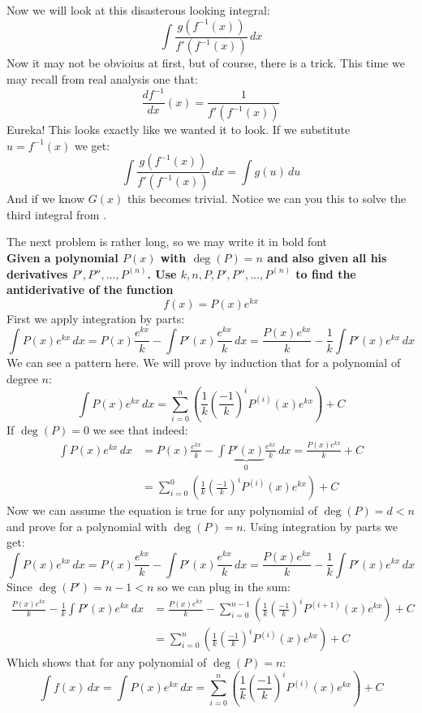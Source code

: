 \documentclass[11pt,a4paper]{article}
\begin{document}
	\newpage
	
	Now we will look at this disasterous looking integral:
	\[
		\int{\frac{g(f^{-1}(x))}{f'(f^{-1}(x))}\,dx}	
	\]
	Now it may not be obvioius at first, but of course, there is a trick.
	This time we may recall from real analysis one that:
	\[
		\frac{df^{-1}}{dx}(x) = \frac{1}{f'(f^{-1}(x))}
	\]
	Eureka! This looks exactly like we wanted it to look. If we substitute
	$u = f^{-1}(x)$ we get:
	\[
		\int{\frac{g(f^{-1}(x))}{f'(f^{-1}(x))}\,dx} = 
		\int{g(u)\,du}	
	\]
	And if we know $G(x)$ this becomes trivial. Notice we can you this to 
	solve the third integral from .
	
	\newpage
	
	The next problem is rather long, so we may write it in bold font
	\\
	\textbf{Given a polynomial $P(x)$ with $\deg(P)=n$ and also given all
	his derivatives $P',P'',...,P^{(n)}$. Use $k,n,P,P',P'',...,P^{(n)}$
	to find the antiderivative of the function
	\[f(x) = P(x)e^{kx}\]}
	First we apply integration by parts:
	\[
		\int{P(x)e^{kx}\,dx} = 
		P(x)\frac{e^{kx}}{k} - \int{P'(x)\frac{e^{kx}}{k}\,dx} = 
		\frac{P(x)e^{kx}}{k} - \frac{1}{k} \int{P'(x)e^{kx}\,dx}
	\]
	We can see a pattern here. We will prove by induction that for a
	polynomial of degree $n$:
	\[
		\int{P(x)e^{kx}\,dx} = \sum_{i=0}^{n}
		\left(\frac{1}{k}\left(\frac{-1}{k}\right)^{i}
		P^{(i)}(x)e^{kx}\right)+C
	\]
	If $\deg(P) = 0$ we see that indeed:
	\begin{align*}
		\int{P(x)e^{kx}\,dx} &= 
		P(x)\frac{e^{kx}}{k} - 
		\int{\underbrace{P'(x)}_0\frac{e^{kx}}{k}\,dx} = 
		\frac{P(x)e^{kx}}{k} + C \\ &=
		\sum_{i=0}^{0}
		\left(\frac{1}{k}\left(\frac{-1}{k}\right)^{i}
		P^{(i)}(x)e^{kx}\right)+C
	\end{align*}
	Now we can assume the equation is true for any polynomial of $\deg(P)=d<n$
	and prove for a polynomial with $\deg(P)=n$. 
	Using integration by parts we get: 
	\[
		\int{P(x)e^{kx}\,dx} = 
		P(x)\frac{e^{kx}}{k} - \int{P'(x)\frac{e^{kx}}{k}\,dx} = 
		\frac{P(x)e^{kx}}{k} - \frac{1}{k} \int{P'(x)e^{kx}\,dx}
	\]
	Since $\deg(P') = n - 1 < n$ so we can plug in the sum:
	\begin{align*}
		\frac{P(x)e^{kx}}{k} - \frac{1}{k} \int{P'(x)e^{kx}\,dx} &= 
		\frac{P(x)e^{kx}}{k} - \sum_{i=0}^{n-1}
		\left(\frac{1}{k}\left(\frac{-1}{k}\right)^{i}
		P^{(i+1)}(x)e^{kx}\right)+C
		\\
		&= \sum_{i=0}^{n}
		\left(\frac{1}{k}\left(\frac{-1}{k}\right)^{i}
		P^{(i)}(x)e^{kx}\right)+C
	\end{align*}
	Which shows that for any polynomial of $\deg(P) = n$:
	\[ \int{f(x)\,dx} = \int{P(x)e^{kx}\,dx} =  
		\sum_{i=0}^{n}
		\left(\frac{1}{k}\left(\frac{-1}{k}\right)^{i}
		P^{(i)}(x)e^{kx}\right)+C
	\]
	
\end{document}
